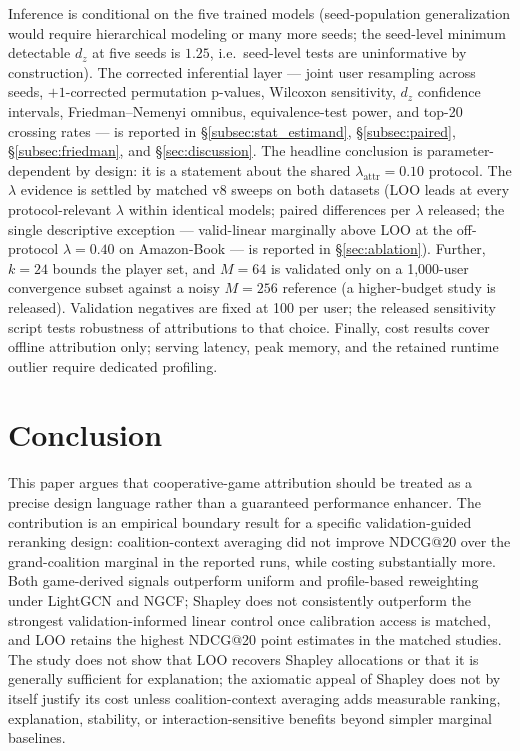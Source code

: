 \documentclass[pdflatex,sn-mathphys-num]{sn-jnl}
\begin{document}
Inference is conditional on the five trained models (seed-population generalization would require hierarchical modeling or many more seeds; the seed-level minimum detectable $d_z$ at five seeds is $1.25$, i.e.\ seed-level tests are uninformative by construction). The corrected inferential layer --- joint user resampling across seeds, $+1$-corrected permutation p-values, Wilcoxon sensitivity, $d_z$ confidence intervals, Friedman--Nemenyi omnibus, equivalence-test power, and top-20 crossing rates --- is reported in \S\ref{subsec:stat_estimand}, \S\ref{subsec:paired}, \S\ref{subsec:friedman}, and \S\ref{sec:discussion}. The headline conclusion is parameter-dependent by design: it is a statement about the shared $\lambda_{\mathrm{attr}}=0.10$ protocol. The $\lambda$ evidence is settled by matched v8 sweeps on both datasets (LOO leads at every protocol-relevant $\lambda$ within identical models; paired differences per $\lambda$ released; the single descriptive exception --- valid-linear marginally above LOO at the off-protocol $\lambda=0.40$ on Amazon-Book --- is reported in \S\ref{sec:ablation}). Further, $k=24$ bounds the player set, and $M=64$ is validated only on a 1,000-user convergence subset against a noisy $M=256$ reference (a higher-budget study is released). Validation negatives are fixed at 100 per user; the released sensitivity script tests robustness of attributions to that choice. Finally, cost results cover offline attribution only; serving latency, peak memory, and the retained runtime outlier require dedicated profiling.


\section{Conclusion}\label{sec:conclusion}

This paper argues that cooperative-game attribution should be treated as a precise design language rather than a guaranteed performance enhancer. The contribution is an empirical boundary result for a specific validation-guided reranking design: coalition-context averaging did not improve NDCG@20 over the grand-coalition marginal in the reported runs, while costing substantially more. Both game-derived signals outperform uniform and profile-based reweighting under LightGCN and NGCF; Shapley does not consistently outperform the strongest validation-informed linear control once calibration access is matched, and LOO retains the highest NDCG@20 point estimates in the matched studies. The study does not show that LOO recovers Shapley allocations or that it is generally sufficient for explanation; the axiomatic appeal of Shapley does not by itself justify its cost unless coalition-context averaging adds measurable ranking, explanation, stability, or interaction-sensitive benefits beyond simpler marginal baselines.
\end{document}
